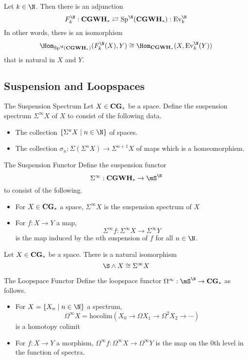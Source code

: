 \documentclass[a4paper]{article}
\begin{document}
\begin{prp}{}{} Let $k\in\N$. Then there is an adjunction $$F_k^\N:\bold{CGWH}_\ast\rightleftarrows\text{Sp}^\N(\bold{CGWH}_\ast):\text{Ev}_k^\N$$ In other words, there is an isomorphism $$\Hom_\bold{\text{Sp}^\N(\bold{CGWH}_\ast)}(F_k^\N(X),Y)\cong\Hom_{\bold{CGWH}_\ast}(X,\text{Ev}_k^\N(Y))$$ that is natural in $X$ and $Y$. 
\end{prp}

\subsection{Suspension and Loopspaces}
\begin{defn}{The Suspension Spectrum}{} Let $X\in\bold{CG}_\ast$ be a space. Define the suspension spectrum $\Sigma^\infty X$ of $X$ to consist of the following data. 
\begin{itemize}
\item The collection $\{\Sigma^n X\;|\;n\in\N\}$ of spaces. 
\item The collection $\sigma_n:\Sigma(\Sigma^nX)\to\Sigma^{n+1}X$ of maps which is a homeomorphism. 
\end{itemize}
\end{defn}

\begin{defn}{The Suspension Functor}{} Define the suspension functor $$\Sigma^\infty:\bold{CGWH}_\ast\to\mS^\N$$ to consist of the following. 
\begin{itemize}
\item For $X\in\bold{CG}_\ast$ a space, $\Sigma^\infty X$ is the suspension spectrum of $X$
\item For $f:X\to Y$ a map, $$\Sigma^\infty f:\Sigma^\infty X\to\Sigma^\infty Y$$ is the map induced by the $n$th suspension of $f$ for all $n\in\N$. 
\end{itemize}
\end{defn}

\begin{prp}{}{} Let $X\in\bold{CG}_\ast$ be a space. There is a natural isomorphism $$\S\wedge X\cong\Sigma^\infty X$$
\end{prp}

\begin{defn}{The Loopspace Functor}{} Define the loopspace functor $\Omega^\infty:\mS^\N\to\bold{CG}_\ast$ as follows. 
\begin{itemize}
\item For $X=\{X_n\;|\;n\in\N\}$ a spectrum, $$\Omega^\infty X=\text{hocolim}(X_0\to\Omega X_1\to\Omega^2X_2\to\cdots)$$ is a homotopy colimit
\item For $f:X\to Y$ a morphism, $\Omega^\infty f:\Omega^\infty X\to\Omega^\infty Y$ is the map on the $0$th level in the function of spectra. 
\end{itemize}
\end{defn}
\end{document}
